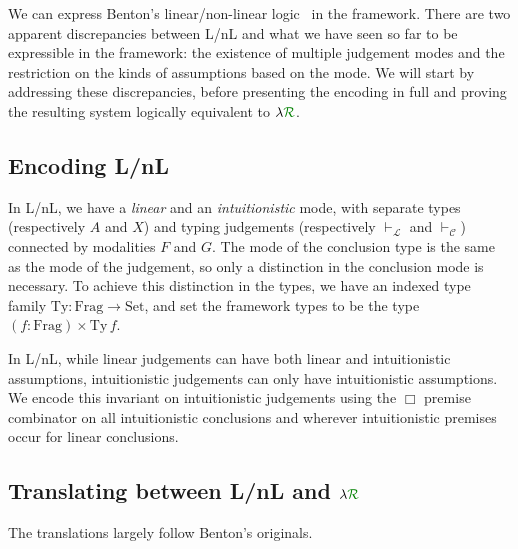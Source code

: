 We can express Benton's linear/non-linear logic~\cite{Benton94} in the
framework.
There are two apparent discrepancies between L/nL and what we have seen so far
to be expressible in the framework: the existence of multiple judgement modes
and the restriction on the kinds of assumptions based on the mode.
We will start by addressing these discrepancies, before presenting the encoding
in full and proving the resulting system logically equivalent to
$\lambda\gr{\mathcal R}$.

\subsection{Encoding L/nL}

In L/nL, we have a \emph{linear} and an \emph{intuitionistic} mode, with
separate types (respectively $A$ and $X$) and typing judgements (respectively
$\vdash_{\mathcal L}$ and $\vdash_{\mathcal C}$) connected by modalities $F$ and
$G$.
The mode of the conclusion type is the same as the mode of the judgement, so
only a distinction in the conclusion mode is necessary.
To achieve this distinction in the types, we have an indexed type family
$\mathrm{Ty} : \mathrm{Frag} \to \mathrm{Set}$, and set the framework types to
be the type $(f : \mathrm{Frag}) \times \mathrm{Ty}\,f$.

In L/nL, while linear judgements can have both linear and intuitionistic
assumptions, intuitionistic judgements can only have intuitionistic assumptions.
We encode this invariant on intuitionistic judgements using the $\Box$
premise combinator on all intuitionistic conclusions and wherever
intuitionistic premises occur for linear conclusions.

\subsection{Translating between L/nL and $\lambda\gr{\mathcal R}$}

The translations largely follow Benton's originals.
